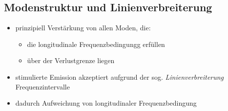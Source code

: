 \documentclass[10pt, aspectratio=169]{beamer}
\begin{document}
\subsection{Modenstruktur und Linienverbreiterung}
\begin{frame}
  \begin{itemize}
  \item<1-> prinzipiell Verst\"arkung von allen Moden, die:
    \begin{itemize}
    \item die longitudinale Frequenzbedingungg erf\"ullen
    \item \"uber der Verlustgrenze liegen 
    \end{itemize}
  \item<2-> stimulierte Emission akzeptiert aufgrund der
    sog. \emph{Linienverbreiterung} Frequenzintervalle
  \item<3-> dadurch Aufweichung von longitudinaler Frequenzbedingung
  \end{itemize}
\end{frame}
\end{document}
